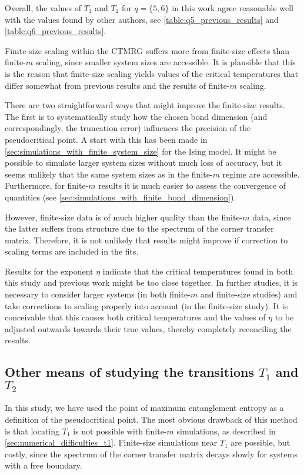 Overall, the values of $T_1$ and $T_2$ for $q = \{ 5, 6 \}$ in this work agree reasonable well with the values found by
other authors, see \autoref{table:q5_previous_results} and \autoref{table:q6_previous_results}.

Finite-size scaling within the CTMRG suffers more from finite-size effects than finite-$m$ scaling,
since smaller system sizes are accessible.
It is plausible that this is the reason that finite-size scaling yields values of the critical temperatures that differ
somewhat from previous results and the results of finite-$m$ scaling.

There are two straightforward ways that might improve the finite-size results.
The first is to systematically study how the chosen bond dimension (and correspondingly,
the truncation error) influences the precision of the pseudocritical point.
A start with this has been made in \autoref{sec:simulations_with_finite_system_size} for the Ising model.
It might be possible to simulate larger system sizes without much loss of accuracy,
but it seems unlikely that the same system sizes as in the finite-$m$ regime are accessible.
Furthermore, for finite-$m$ results it is much easier to assess the convergence of quantities (see
\autoref{sec:simulations_with_finite_bond_dimension}).

However, finite-size data is of much higher quality than the finite-$m$ data,
since the latter suffers from structure due to the spectrum of the corner transfer matrix.
Therefore, it is not unlikely that results might improve if correction to scaling terms are included in the fits.

Results for the exponent $\eta$ indicate that the critical temperatures found in both this study and previous work might
be too close together.
In further studies, it is necessary to consider larger systems (in both finite-$m$ and finite-size studies)
and take corrections to scaling properly into account (in the finite-size study).
It is conceivable that this causes both critical temperatures and the values of $\eta$ to be adjusted outwards
towards their true values, thereby completely reconciling the results.

\subsection{Other means of studying the transitions $T_1$ and $T_2$}

In this study, we have used the point of maximum entanglement entropy as a definition of the pseudocritical point.
The most obvious drawback of this method is that locating $T_1$ is not possible with finite-$m$ simulations,
as described in \autoref{sec:numerical_difficulties_t1}.
Finite-size simulations near $T_1$ are possible, but costly, since the spectrum of the corner transfer matrix decays
slowly for systems with a free boundary.

